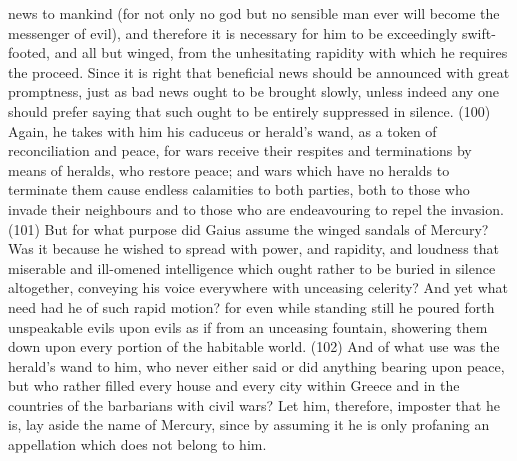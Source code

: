 news to mankind (for not only no god but no sensible man ever will become the messenger of evil),
and therefore it is necessary for him to be exceedingly swift-footed, and all but winged, from the
unhesitating rapidity with which he requires the proceed. Since it is right that beneficial news should
be announced with great promptness, just as bad news ought to be brought slowly, unless indeed
any one should prefer saying that such ought to be entirely suppressed in silence. (100) Again, he
takes with him his caduceus or herald's wand, as a token of reconciliation and peace, for wars
receive their respites and terminations by means of heralds, who restore peace; and wars which
have no heralds to terminate them cause endless calamities to both parties, both to those who
invade their neighbours and to those who are endeavouring to repel the invasion. (101) But for
what purpose did Gaius assume the winged sandals of Mercury? Was it because he wished to
spread with power, and rapidity, and loudness that miserable and ill-omened intelligence which
ought rather to be buried in silence altogether, conveying his voice everywhere with unceasing
celerity? And yet what need had he of such rapid motion? for even while standing still he poured
forth unspeakable evils upon evils as if from an unceasing fountain, showering them down upon
every portion of the habitable world. (102) And of what use was the herald's wand to him, who
never either said or did anything bearing upon peace, but who rather filled every house and every
city within Greece and in the countries of the barbarians with civil wars? Let him, therefore,
imposter that he is, lay aside the name of Mercury, since by assuming it he is only profaning an
appellation which does not belong to him.

